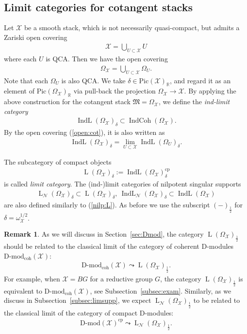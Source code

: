 \documentclass [11pt,oneside,a4paper,mathscr]{amsart}
\theoremstyle{definition}
\newtheorem{remark}[thm]{Remark}
\newcommand{\LL}{\operatorname{L}}
\newcommand{\X}{\mathcal{X}}
\newcommand{\IndCoh}{\operatorname{IndCoh}}
\newcommand{\IndL}{\operatorname{IndL}}
\begin{document}
\subsection{Limit categories for cotangent stacks}\label{subsec:limcot}
Let $\X$ be a smooth stack, which is
not necessarily quasi-compact, but admits a Zariski open covering 
\begin{align*}
    \X=\bigcup_{U\subset \X} U
\end{align*}
where each $U$ is QCA. 
Then we have the open covering
\begin{align}\label{open:cot}
    \Omega_{\X}=\bigcup_{U\subset \mathcal{X}} \Omega_{U}.
\end{align}
Note that each $\Omega_U$ is also QCA. 
We take 
$\delta \in \mathrm{Pic}(\X)_{\mathbb{R}}$, 
and regard it as an element of $\mathrm{Pic}(\Omega_{\X})_{\mathbb{R}}$ 
via pull-back the projection 
$\Omega_{\X} \to \X$. 
By applying the above construction for the cotangent stack
$\mathfrak{M}=\Omega_{\X}$, 
we define the \textit{ind-limit category} 
\begin{align*} \IndL(\Omega_{\X})_{\delta} \subset 
    \IndCoh(\Omega_{\X}). 
\end{align*}
By the open covering (\ref{open:cot}), it is also written as 
\begin{align*}%
    \IndL(\Omega_{\X})_{\delta}=\lim_{U\subset \X} \IndL(\Omega_U)_{\delta}. 
\end{align*}

The subcategory of compact objects 
\begin{align*}
    \LL(\Omega_{\X})_{\delta}:=\IndL(\Omega_{\X})_{\delta}^{\mathrm{cp}}
\end{align*}
is called \textit{limit category}. The (ind-)limit categories of nilpotent singular supports 
\begin{align}\label{limit:nilp}
    \LL_{\mathcal{N}}(\Omega_{\X})_{\delta} \subset \LL(\Omega_{\X})_{\delta}, \ 
    \IndL_{\mathcal{N}}(\Omega_{\X})_{\delta} \subset \IndL(\Omega_{\X})
\end{align}
are also defined similarly to (\ref{nilp:L}). As before we use the subscript $(-)_{\frac{1}{2}}$ for $\delta=\omega_{\X}^{1/2}$.
\begin{remark}\label{rmk:limit}
As we will discuss in Section~\ref{sec:Dmod}, 
the category $\LL(\Omega_{\X})_{\frac{1}{2}}$ should be related to
the classical limit of the category of coherent D-modules 
$\text{D-mod}_{\mathrm{coh}}(\X)$:
\begin{align*}
    \text{D-mod}_{\mathrm{coh}}(\X) \leadsto \LL(\Omega_{\X})_{\frac{1}{2}}.
\end{align*}
For example, when $\X=BG$ for a reductive group $G$, the category $\LL(\Omega_{\X})_{\frac{1}{2}}$ is equivalent to 
$\text{D-mod}_{\mathrm{coh}}(\X)$, see Subsection~\ref{subsec:exam}. 
Similarly, as we discuss in Subsection~\ref{subsec:limsupp}, we expect $\LL_{\mathcal{N}}(\Omega_{\X})_{\frac{1}{2}}$ to be related to the classical limit of the category of compact D-modules: 
\begin{align*}
    \text{D-mod}(\X)^{\mathrm{cp}} \leadsto \LL_{\mathcal{N}}(\Omega_{\X})_{\frac{1}{2}}.
\end{align*}
\end{remark}
\end{document}
